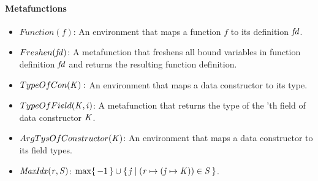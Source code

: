


\paragraph{Metafunctions}

\begin{itemize}
\item $Function(f)$: An environment that maps a function $f$ to its definition $\mathit{fd}$.

\item $Freshen(\mathit{fd})$: A metafunction that freshens all bound variables in function definition
$\mathit{fd}$ and returns the resulting function definition.

\item $TypeOfCon(\mathit{K}):$ An environment that maps a data constructor to its type.

\item $TypeOfField(\mathit{K},i)$: A metafunction that returns the type of the 'th field
of data constructor $\mathit{K}$.

\item $ArgTysOfConstructor(\mathit{K})$: An environment that maps a data constructor to its field types.

\item $\mathit{MaxIdx}(\mathit{r},\mathit{S})$: $\max \{ \, -1 \,\} \cup \{ \,  \mathit{j} \; | \; {(\mathit{r} \mapsto (\mathit{j} \mapsto \mathit{K})) \in \mathit{S}} \,\}$.
\end{itemize}


